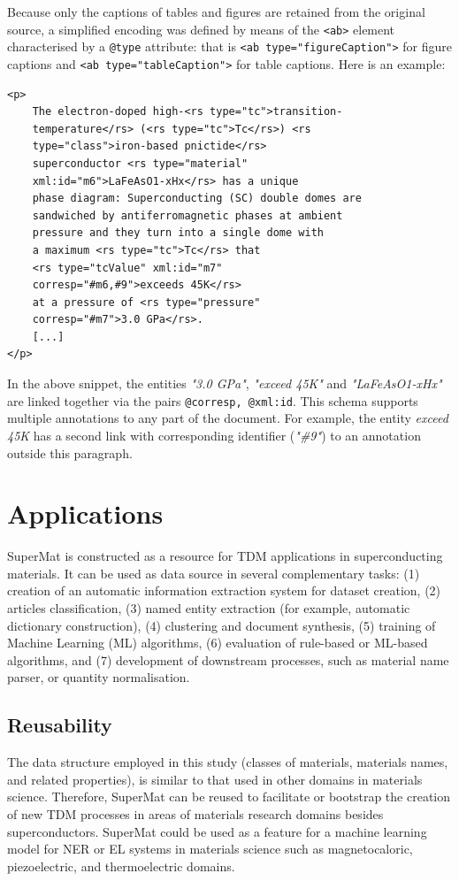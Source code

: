 \documentclass[fleqn,10pt]{wlscirep}
\begin{document}
Because only the captions of tables and figures are retained from the original source, a simplified encoding was defined by means of the \texttt{<ab>} element characterised by a \texttt{@type} attribute: that is \texttt{<ab type="figureCaption">} for figure captions and \texttt{<ab type="tableCaption">} for table captions. 
Here is an example: 

\begin{verbatim}
<p>
    The electron-doped high-<rs type="tc">transition-
    temperature</rs> (<rs type="tc">Tc</rs>) <rs 
    type="class">iron-based pnictide</rs> 
    superconductor <rs type="material" 
    xml:id="m6">LaFeAsO1-xHx</rs> has a unique 
    phase diagram: Superconducting (SC) double domes are 
    sandwiched by antiferromagnetic phases at ambient 
    pressure and they turn into a single dome with 
    a maximum <rs type="tc">Tc</rs> that 
    <rs type="tcValue" xml:id="m7" 
    corresp="#m6,#9">exceeds 45K</rs> 
    at a pressure of <rs type="pressure" 
    corresp="#m7">3.0 GPa</rs>. 
    [...]
</p>
\end{verbatim}

In the above snippet, the entities \textit{"3.0 GPa"}, \textit{"exceed 45K"} and \textit{"LaFeAsO1-xHx"} are linked together via the pairs \texttt{@corresp, @xml:id}. 
This schema supports multiple annotations to any part of the document. 
For example, the entity \textit{exceed 45K} has a second link with corresponding identifier (\textit{"\#9"}) to an annotation outside this paragraph.


\section*{Applications}
\label{sec:applications}
SuperMat is constructed as a resource for TDM applications in superconducting materials. It can be used as data source in several complementary tasks: 
(1) creation of an automatic information extraction system for dataset creation,
(2) articles classification, 
(3) named entity extraction (for example, automatic dictionary construction), 
(4) clustering and document synthesis,
(5) training of Machine Learning (ML) algorithms,
(6) evaluation of rule-based or ML-based algorithms, and 
(7) development of downstream processes, such as material name parser, or quantity normalisation.

\subsection*{Reusability}
The data structure employed in this study (classes of materials, materials names, and related properties), is similar to that used in other domains in materials science. 
Therefore, SuperMat can be reused to facilitate or bootstrap the creation of new TDM processes in areas of materials research domains besides superconductors.
SuperMat could be used as a feature for a machine learning model for NER or EL systems in materials science such as magnetocaloric, piezoelectric, and thermoelectric domains.  
\end{document}
